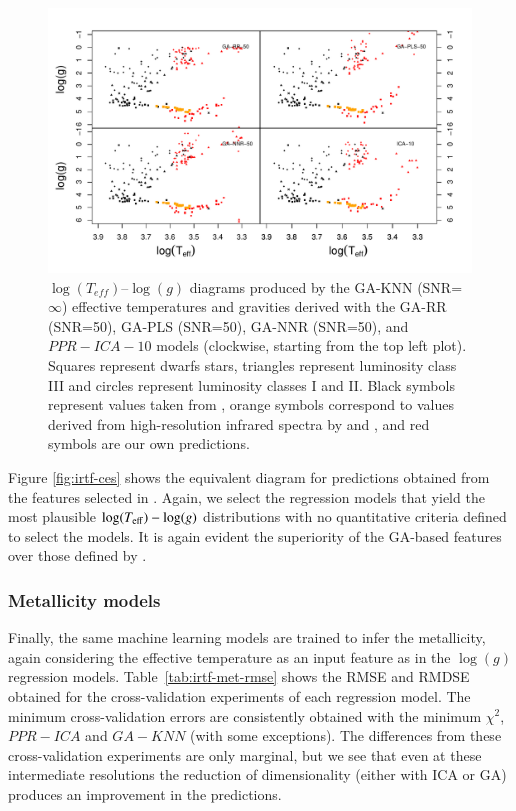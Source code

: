 \begin{figure}
 \begin{center}
   \includegraphics[width=\textwidth]{figs/ordieres-fig4.pdf}
\caption{$\log(T_{eff})$--$\log(g)$ diagrams produced by the GA-KNN
   (SNR=$\infty$) effective temperatures and gravities derived with
   the GA-RR (SNR=50), GA-PLS (SNR=50), GA-NNR (SNR=50), and
   $PPR-ICA-10$ models (clockwise, starting from the top left
   plot). Squares represent dwarfs stars, triangles represent
   luminosity class {\sc III} and circles represent luminosity classes
   {\sc I} and {\sc II}. Black symbols represent values taken
   from \protect\cite{cesetti}, orange symbols correspond to values
   derived from high-resolution infrared spectra by \protect\cite{esm1}
   and \protect\cite{esm2}, and red symbols are our own predictions.}

\label{fig:lt_lg_ga}
 \end{center}
\end{figure}

Figure \ref{fig:irtf-ces} shows the equivalent diagram for predictions
obtained from the features selected in \cite{cesetti}. Again, we
select the regression models that yield the most plausible
$\log(T_{\rm eff})-\log(g)$ distributions with no quantitative
criteria defined to select the models. It is again evident the
superiority of the GA-based features over those defined
by \cite{cesetti}.

\subsubsection{Metallicity models} 
\label{sect:irtf-met}

Finally, the same machine learning models are trained to infer the
metallicity, again considering the effective temperature as an input
feature as in the $\log(g)$ regression
models. Table~\ref{tab:irtf-met-rmse} shows the RMSE and RMDSE
obtained for the cross-validation experiments of each regression
model. The minimum cross-validation errors are consistently obtained
with the minimum $\chi^2$, $PPR-ICA$ and $GA-KNN$ (with some
exceptions). The differences from these cross-validation experiments
are only marginal, but we see that even at these intermediate
resolutions the reduction of dimensionality (either with ICA or GA)
produces an improvement in the predictions. 

